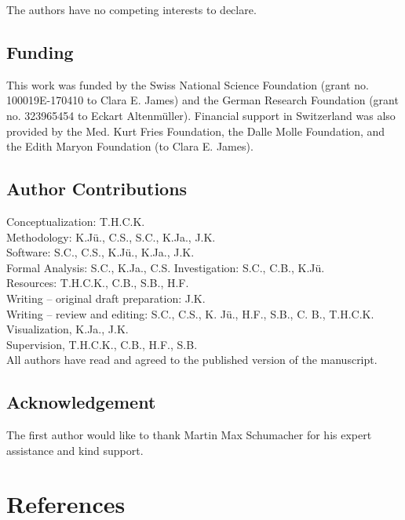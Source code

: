 \documentclass[
]{agujournal2019}
\newlength{\cslhangindent}
\newenvironment{CSLReferences}[2] %
 {\begin{list}{}{%
  \setlength{\itemindent}{0pt}
  \setlength{\leftmargin}{0pt}
  \setlength{\parsep}{0pt}
  \ifodd #1
   \setlength{\leftmargin}{\cslhangindent}
   \setlength{\itemindent}{-1\cslhangindent}
  \fi
  \setlength{\itemsep}{#2\baselineskip}}}
 {\end{list}}
\begin{document}
The authors have no competing interests to declare.

\subsection{Funding}\label{funding}

This work was funded by the Swiss National Science Foundation (grant no.
100019E-170410 to Clara E. James) and the German Research Foundation
(grant no. 323965454 to Eckart Altenmüller). Financial support in
Switzerland was also provided by the Med. Kurt Fries Foundation, the
Dalle Molle Foundation, and the Edith Maryon Foundation (to Clara E.
James).

\subsection{Author Contributions}\label{author-contributions}

Conceptualization: T.H.C.K.\\
Methodology: K.Jü., C.S., S.C., K.Ja., J.K.\\
Software: S.C., C.S., K.Jü., K.Ja., J.K.\\
Formal Analysis: S.C., K.Ja., C.S. Investigation: S.C., C.B., K.Jü.\\
Resources: T.H.C.K., C.B., S.B., H.F.\\
Writing -- original draft preparation: J.K.\\
Writing -- review and editing: S.C., C.S., K. Jü., H.F., S.B., C. B.,
T.H.C.K.\\
Visualization, K.Ja., J.K.\\
Supervision, T.H.C.K., C.B., H.F., S.B.\\
All authors have read and agreed to the published version of the
manuscript.

\subsection{Acknowledgement}\label{acknowledgement}

The first author would like to thank Martin Max Schumacher for his
expert assistance and kind support.

\section*{References}\label{references}

\label{refs}
\begin{CSLReferences}{0}{1}
\vspace{1em}

\end{CSLReferences}
\end{document}
